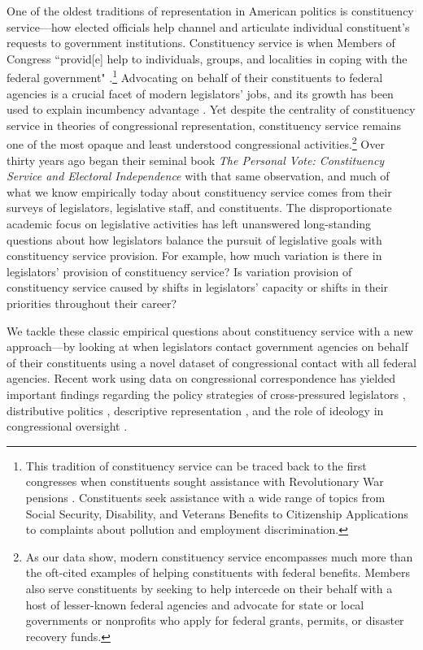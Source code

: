 \documentclass[12pt]{article}
\begin{document}
One of the oldest traditions of representation in American politics is constituency service---how elected officials help channel and articulate individual constituent's requests to government institutions. Constituency service is when Members of Congress ``provid[e] help to individuals, groups, and localities in coping with the federal government" \citep{Fenno1978}.\footnote{This tradition of constituency service can be traced back to the first congresses when constituents sought assistance with Revolutionary War pensions \citep{Eckman2017}. Constituents seek assistance with a wide range of topics from Social Security, Disability, and Veterans Benefits to Citizenship Applications to complaints about pollution and employment discrimination.} Advocating on behalf of their constituents to federal agencies is a crucial facet of modern legislators' jobs, and its growth has been used to explain incumbency advantage \citep{King1991}. Yet despite the centrality of constituency service in theories of congressional representation, constituency service remains one of the most opaque and least understood congressional activities.\footnote{As our data show, modern constituency service encompasses much more than the oft-cited examples of helping constituents with federal benefits. Members also serve constituents by seeking to help intercede on their behalf with a host of lesser-known federal agencies and advocate for state or local governments or nonprofits who apply for federal grants, permits, or disaster recovery funds.} Over thirty years ago \citet*{CainFerejohnFiorina1987} began their seminal book \emph{The Personal Vote: Constituency Service and Electoral Independence} with that same observation, and much of what we know empirically today about constituency service comes from their surveys of legislators, legislative staff, and constituents. The disproportionate academic focus on legislative activities has left unanswered long-standing questions about how legislators balance the pursuit of legislative goals with constituency service provision. 
For example, how much variation is there in legislators' provision of constituency service? 
Is variation provision of constituency service caused by shifts in legislators' capacity or shifts in their priorities throughout their career? 

We tackle these classic empirical questions about constituency service with a new approach---by looking at when legislators contact government agencies on behalf of their constituents using a novel dataset of congressional contact with all federal agencies. Recent work using data on congressional correspondence has yielded important findings regarding the policy strategies of cross-pressured legislators \citep{Ritchie2017}, distributive politics \citep{MillsKalafHuges2015}, descriptive representation \citep{LowandeRitchieLauterbach2018}, and the role of ideology in congressional oversight \citep{Lowande2018JOP}. 
\end{document}
